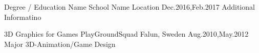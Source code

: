 \begin{section}[Education]
  \entry%
    {Degree / Education Name}
    {School Name}
    {Location}
    {Dec.2016,Feb.2017}
    {Additional Informatino}%

  \entry%
    {3D Graphics for Games}
    {PlayGroundSquad} %
    {Falun, Sweden} %
    {Aug.2010,May.2012} %
    {Major 3D-Animation/Game Design}%
\end{section}%
